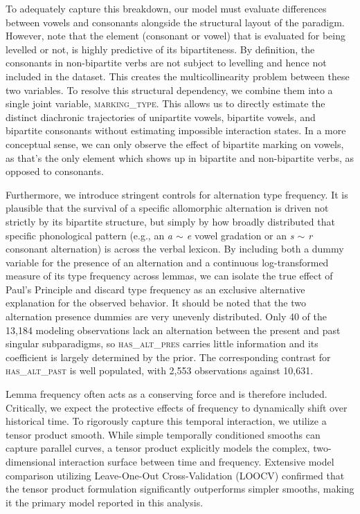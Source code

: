 To adequately capture this breakdown, our model must evaluate differences between vowels and consonants alongside the structural layout of the paradigm. However, note that the element (consonant or vowel) that is evaluated for being levelled or not, is highly predictive of its bipartiteness. By definition, the consonants in non-bipartite verbs are not subject to levelling and hence not included in the dataset. This creates the multicollinearity problem between these two variables. To resolve this structural dependency, we combine them into a single joint variable, \textsc{marking\_type}. This allows us to directly estimate the distinct diachronic trajectories of unipartite vowels, bipartite vowels, and bipartite consonants without estimating impossible interaction states. In a more conceptual sense, we can only observe the effect of bipartite marking on vowels, as that's the only element which shows up in bipartite and non-bipartite verbs, as opposed to consonants. 

Furthermore, we introduce stringent controls for alternation type frequency. It is plausible that the survival of a specific allomorphic alternation is driven not strictly by its bipartite structure, but simply by how broadly distributed that specific phonological pattern (e.g., an \textit{a $\sim$ e} vowel gradation or an \textit{s $\sim$ r} consonant alternation) is across the verbal lexicon. By including both a dummy variable for the presence of an alternation and a continuous log-transformed measure of its type frequency across lemmas, we can isolate the true effect of Paul's Principle and discard type frequency as an exclusive alternative explanation for the observed behavior. It should be noted that the two alternation presence dummies are very unevenly distributed. Only 40 of the 13,184 modeling observations lack an alternation between the present and past singular subparadigms, so \textsc{has\_alt\_pres} carries little information and its coefficient is largely determined by the prior. The corresponding contrast for \textsc{has\_alt\_past} is well populated, with 2,553 observations against 10,631.

Lemma frequency often acts as a conserving force and is therefore included. Critically, we expect the protective effects of frequency to dynamically shift over historical time. To rigorously capture this temporal interaction, we utilize a tensor product smooth. While simple temporally conditioned smooths can capture parallel curves, a tensor product explicitly models the complex, two-dimensional interaction surface between time and frequency. Extensive model comparison utilizing Leave-One-Out Cross-Validation (LOOCV) \citep{vehtari2017practical} confirmed that the tensor product formulation significantly outperforms simpler smooths, making it the primary model reported in this analysis.

